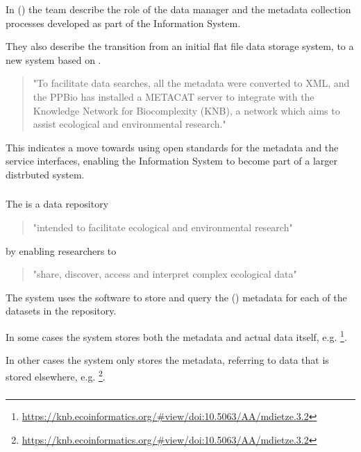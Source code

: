 \documentclass{article}
\begin{document}
In  (\cite{pezzini-2012}) 
the \cite{ppbio} team describe the role of the data manager and the metadata
collection processes developed as part of the \cite{ppbio} Information System.

They also describe the transition from an initial flat file data storage system,
to a new system based on \cite{metacat}.

\begin{quote}
"To facilitate data searches, all the metadata were converted to XML,
and the PPBio has installed a METACAT server to integrate with the
Knowledge Network for Biocomplexity (KNB), a network which aims to
assist ecological and environmental research."
\end{quote}

This indicates a move towards using open standards for the
metadata and the service interfaces, enabling the
\cite{ppbio} Information System
to become part of a larger distrbuted system.

\subsubsection{}

The  {\cite{knb}} is a data repository
\begin{quote}
"intended to facilitate ecological and environmental research"
\end{quote}
by enabling researchers to
\begin{quote}
"share, discover, access and interpret complex ecological data"
\end{quote}

The \cite{knb} system uses the \cite{metacat} software to store and query
the  (\cite{eml}) metadata for each of the datasets in the repository.

In some cases the \cite{knb} system stores both the metadata and actual
data itself, e.g.
\footnote{\url{https://knb.ecoinformatics.org/#view/doi:10.5063/AA/mdietze.3.2}}.

In other cases the \cite{knb} system only stores the metadata,
referring to data that is stored elsewhere, e.g.
\footnote{\url{https://knb.ecoinformatics.org/#view/doi:10.5063/AA/mdietze.3.2}}.


\subsubsection{\cite{metacat}}
\end{document}
